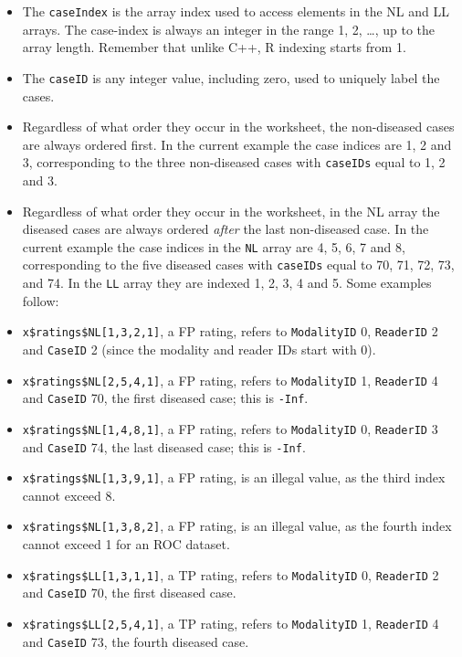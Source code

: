 \documentclass[
]{book}
\providecommand{\tightlist}{%
  \setlength{\itemsep}{0pt}\setlength{\parskip}{0pt}}
\begin{document}
\begin{itemize}
\tightlist
\item
  The \texttt{caseIndex} is the array index used to access elements in the NL and LL arrays. The case-index is always an integer in the range 1, 2, \ldots, up to the array length. Remember that unlike C++, R indexing starts from 1.
\item
  The \texttt{caseID} is any integer value, including zero, used to uniquely label the cases.
\item
  Regardless of what order they occur in the worksheet, the non-diseased cases are always ordered first. In the current example the case indices are 1, 2 and 3, corresponding to the three non-diseased cases with \texttt{caseIDs} equal to 1, 2 and 3.
\item
  Regardless of what order they occur in the worksheet, in the NL array the diseased cases are always ordered \emph{after} the last non-diseased case. In the current example the case indices in the \texttt{NL} array are 4, 5, 6, 7 and 8, corresponding to the five diseased cases with \texttt{caseIDs} equal to 70, 71, 72, 73, and 74. In the \texttt{LL} array they are indexed 1, 2, 3, 4 and 5. Some examples follow:
\item
  \texttt{x\$ratings\$NL{[}1,3,2,1{]}}, a FP rating, refers to \texttt{ModalityID} 0, \texttt{ReaderID} 2 and \texttt{CaseID} 2 (since the modality and reader IDs start with 0).
\item
  \texttt{x\$ratings\$NL{[}2,5,4,1{]}}, a FP rating, refers to \texttt{ModalityID} 1, \texttt{ReaderID} 4 and \texttt{CaseID} 70, the first diseased case; this is \texttt{-Inf}.
\item
  \texttt{x\$ratings\$NL{[}1,4,8,1{]}}, a FP rating, refers to \texttt{ModalityID} 0, \texttt{ReaderID} 3 and \texttt{CaseID} 74, the last diseased case; this is \texttt{-Inf}.
\item
  \texttt{x\$ratings\$NL{[}1,3,9,1{]}}, a FP rating, is an illegal value, as the third index cannot exceed 8.
\item
  \texttt{x\$ratings\$NL{[}1,3,8,2{]}}, a FP rating, is an illegal value, as the fourth index cannot exceed 1 for an ROC dataset.
\item
  \texttt{x\$ratings\$LL{[}1,3,1,1{]}}, a TP rating, refers to \texttt{ModalityID} 0, \texttt{ReaderID} 2 and \texttt{CaseID} 70, the first diseased case.
\item
  \texttt{x\$ratings\$LL{[}2,5,4,1{]}}, a TP rating, refers to \texttt{ModalityID} 1, \texttt{ReaderID} 4 and \texttt{CaseID} 73, the fourth diseased case.
\end{itemize}
\end{document}

